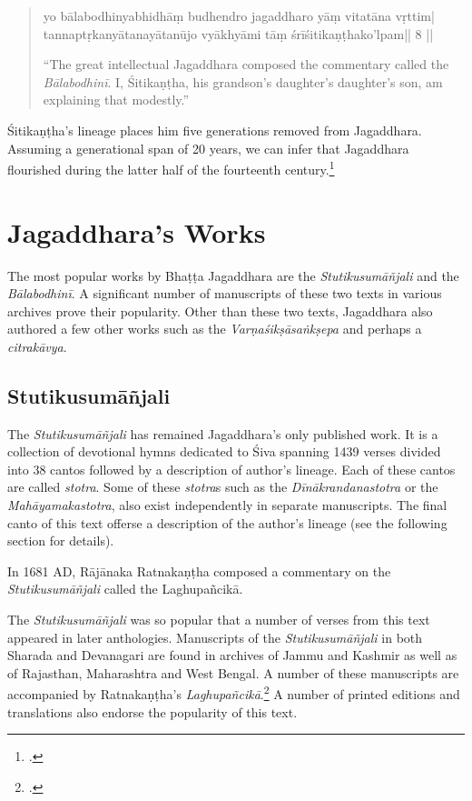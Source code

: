 \begin{quote}

\textsanskrit{yo bālabodhinyabhidhāṃ budhendro jagaddharo yāṃ vitatāna vṛttim|\\
tannaptṛkanyātanayātanūjo vyākhyāmi tāṃ śrīśitikaṇṭhako'lpam|| 8 ||\\}

“The great intellectual Jagaddhara composed the commentary called the \emph{Bālabodhinī}. I, Śitikaṇṭha, his grandson's daughter's daughter's son, am explaining that modestly.” 

\end{quote}
Śitikaṇṭha's lineage places him five generations removed from Jagaddhara. Assuming a generational span of 20 years, we can infer that Jagaddhara flourished during the latter half of the fourteenth century.\footcite[3]{Durgaprasad1891} 

\section{Jagaddhara's Works}

The most popular works by Bhaṭṭa Jagaddhara are the \emph{Stutikusumāñjali} and the \emph{Bālabodhinī}. A significant number of manuscripts of these two texts in various archives prove their popularity. Other than these two texts, Jagaddhara also authored a few other works such as the \emph{Varṇaśikṣāsaṅkṣepa} and perhaps a \emph{citrakāvya}. 

\subsection{Stutikusumāñjali}

The \emph{Stutikusumāñjali} has remained Jagaddhara’s only published work. It is a collection of devotional hymns dedicated to Śiva spanning 1439 verses divided into 38 cantos followed by a description of author's lineage. Each of these cantos are called \emph{stotra}. Some of these \emph{stotra}s such as the \emph{Dīnākrandanastotra} or the \emph{Mahāyamakastotra}, also exist independently in separate manuscripts. The final canto of this text offerse a description of the author's lineage (see the following section for details). 

In 1681 AD, Rājānaka Ratnakaṇṭha composed a commentary on the \emph{Stutikusumāñjali} called the Laghupañcikā. 

The \emph{Stutikusumāñjali} was so popular that a number of verses from this text appeared in later anthologies. Manuscripts of the \emph{Stutikusumāñjali} in both Sharada and Devanagari are found in archives of Jammu and Kashmir as well as of Rajasthan, Maharashtra and West Bengal. A number of these manuscripts are accompanied by Ratnakaṇṭha's \emph{Laghupañcikā}.\footcite[87]{Stainton2019} A number of printed editions and translations also endorse the popularity of this text. 

